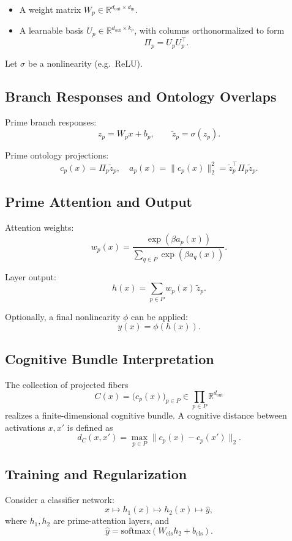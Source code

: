 \documentclass[11pt]{article}
\begin{document}
\begin{itemize}[nosep]
  \item A weight matrix $W_p \in \mathbb{R}^{d_{\mathrm{out}}\times d_{\mathrm{in}}}$.
  \item A learnable basis $U_p \in \mathbb{R}^{d_{\mathrm{out}}\times k_p}$, with columns orthonormalized to form
  \[
  \Pi_p = U_p U_p^\top.
  \]
\end{itemize}

Let $\sigma$ be a nonlinearity (e.g.\ ReLU).

\subsection{Branch Responses and Ontology Overlaps}

Prime branch responses:
\[
z_p = W_p x + b_p,\qquad \tilde{z}_p = \sigma(z_p).
\]

Prime ontology projections:
\[
c_p(x) = \Pi_p \tilde{z}_p,\quad a_p(x) = \|c_p(x)\|_2^2 = \tilde{z}_p^\top \Pi_p \tilde{z}_p.
\]

\subsection{Prime Attention and Output}

Attention weights:
\[
w_p(x) = \frac{\exp(\beta a_p(x))}{\sum_{q\in P} \exp(\beta a_q(x))}.
\]

Layer output:
\[
h(x) = \sum_{p\in P} w_p(x)\,\tilde{z}_p.
\]

Optionally, a final nonlinearity $\phi$ can be applied:
\[
y(x)=\phi(h(x)).
\]

\subsection{Cognitive Bundle Interpretation}

The collection of projected fibers
\[
C(x) = \big(c_p(x)\big)_{p\in P} \in \prod_{p\in P}\mathbb{R}^{d_{\mathrm{out}}}
\]
realizes a finite-dimensional cognitive bundle. A cognitive distance between activations $x,x'$ is defined as
\[
d_C(x,x') = \max_{p\in P} \|c_p(x) - c_p(x')\|_2.
\]

\subsection{Training and Regularization}

Consider a classifier network:
\[
x \mapsto h_1(x) \mapsto h_2(x) \mapsto \hat{y},
\]
where $h_1,h_2$ are prime-attention layers, and
\[
\hat{y} = \mathrm{softmax}(W_{\mathrm{cls}} h_2 + b_{\mathrm{cls}}).
\]
\end{document}
